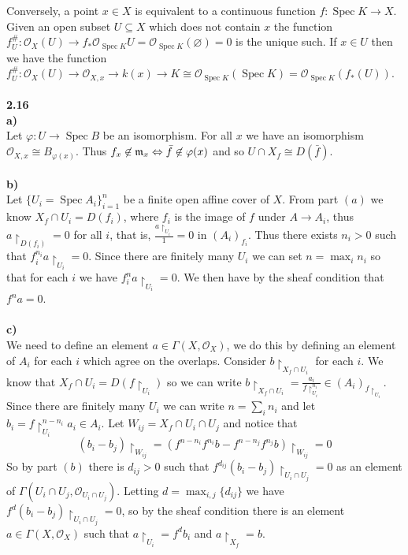 \documentclass[12pt]{article}
\numberwithin{thm}{subsection}
\numberwithin{defn}{subsection}
\numberwithin{lemma}{subsection}
\numberwithin{example}{subsection}
\numberwithin{notation}{subsection}
\numberwithin{cor}{subsection}
\numberwithin{remark}{subsection}
\numberwithin{condition}{subsection}
\numberwithin{question}{subsection}
\numberwithin{construction}{subsection}
\numberwithin{construction}{subsection}
\numberwithin{construction}{subsection}
\newcommand{\call}[1]{\mathcal{#1}}
\newcommand{\lto}{\longrightarrow}
\begin{document}
Conversely, a point $x \in X$ is equivalent to a continuous function $f: \operatorname{Spec}K \to X$. Given an open subset $U \subseteq X$ which does not contain $x$ the function $f^{\#}_U: \call{O}_X(U) \to f_\ast\call{O}_{\operatorname{Spec}K}U = \call{O}_{\operatorname{Spec}K}(\varnothing) = 0$ is the unique such. If $x \in U$ then we have the function $f_U^{\#}: \call{O}_X(U) \to \call{O}_{X,x} \to k(x) \to K \cong \call{O}_{\operatorname{Spec}K}(\operatorname{Spec}K) = \call{O}_{\operatorname{Spec}K}(f_\ast(U))$.\\\\
%
\textbf{2.16}\\
\textbf{a)}\\
Let $\varphi: U \lto \operatorname{Spec}B$ be an isomorphism. For all $x$ we have an isomorphism $\call{O}_{X,x} \cong B_{\varphi(x)}$. Thus $f_x \not\in \frak{m}_x \Leftrightarrow \bar{f} \not\in \varphi(x)$ and so $U \cap X_f \cong D(\bar{f})$.\\\\
%
\textbf{b)}\\
Let $\lbrace U_i = \operatorname{Spec}A_i\rbrace_{i= 1}^n$ be a finite open affine cover of $X$. From part $(a)$ we know $X_f \cap U_i = D(f_i)$, where $f_i$ is the image of $f$ under $A \lto A_i$, thus $a\restriction_{D(f_i)} = 0$ for all $i$, that is, $\frac{a\restriction_{U_i}}{1} = 0$ in $(A_i)_{f_i}$. Thus there exists $n_i >0$ such that $f_i^{n_i}a\restriction_{U_i} = 0$. Since there are finitely many $U_i$ we can set $n = \max_i{n_i}$ so that for each $i$ we have $f_i^n a\restriction_{U_i} = 0$. We then have by the sheaf condition that $f^n a= 0$.\\\\
%
\textbf{c)}\\
We need to define an element $a \in \Gamma(X,\call{O}_X)$, we do this by defining an element of $A_i$ for each $i$ which agree on the overlaps. Consider $b\restriction_{X_f \cap U_i}$ for each $i$. We know that $X_f \cap U_i = D(f\restriction_{U_i})$ so we can write $b\restriction_{X_f \cap U_i} = \frac{a_i}{f\restriction_{U_i}^{n_i}} \in (A_i)_{f\restriction_{U_i}}$. Since there are finitely many $U_i$ we can write $n = \sum_i n_i$ and let $b_i = f\restriction_{U_i}^{n-n_i} a_i \in A_i$. Let $W_{ij} = X_f \cap U_i \cap U_j$ and notice that \[(b_i - b_j)\restriction_{W_{ij}} = (f^{n-n_i}f^{n_i}b-f^{n-n_j}f^{n_j}b)\restriction_{W_{ij}} = 0\]
So by part $(b)$ there is $d_{ij}>0$ such that $f^{d_{ij}}(b_i - b_j)\restriction_{U_{i} \cap U_j} = 0$ as an element of $\Gamma(U_i \cap U_j, \call{O}_{U_i \cap U_j})$. Letting $d = \max_{i,j}\lbrace d_{ij}\rbrace$ we have $f^d(b_i - b_j)\restriction_{U_{i} \cap U_j} = 0$, so by the sheaf condition there is an element $a \in \Gamma(X,\call{O}_X)$ such that $a\restriction_{U_i} = f^db_i$ and $a\restriction_{X_f} = b$.\\\\
\end{document}
